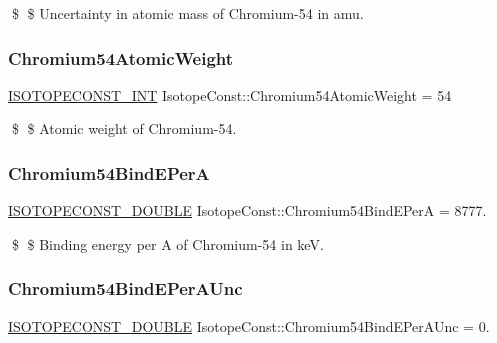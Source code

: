\$ \$ Uncertainty in atomic mass of Chromium-\/54 in amu. \mbox{\label{group___isotope_const-_chromium-_cr54_ga0bc122cbe23e1a05ae4f770c1b1b24de}} 
\subsubsection{\texorpdfstring{Chromium54\+Atomic\+Weight}{Chromium54AtomicWeight}}
{\footnotesize\ttfamily \mbox{\hyperlink{group___isotope_const-_macros_ga5f18360b3e99483a35c32d789e62621c}{I\+S\+O\+T\+O\+P\+E\+C\+O\+N\+S\+T\+\_\+\+I\+NT}} Isotope\+Const\+::\+Chromium54\+Atomic\+Weight = 54}

\$ \$ Atomic weight of Chromium-\/54. \mbox{\label{group___isotope_const-_chromium-_cr54_ga68a34d9a758e04f40316913c52387df7}} 
\subsubsection{\texorpdfstring{Chromium54\+Bind\+E\+PerA}{Chromium54BindEPerA}}
{\footnotesize\ttfamily \mbox{\hyperlink{group___isotope_const-_macros_ga8f45a7272ce02c0b4c65c44636ed719a}{I\+S\+O\+T\+O\+P\+E\+C\+O\+N\+S\+T\+\_\+\+D\+O\+U\+B\+LE}} Isotope\+Const\+::\+Chromium54\+Bind\+E\+PerA = 8777.}

\$ \$ Binding energy per A of Chromium-\/54 in keV. \mbox{\label{group___isotope_const-_chromium-_cr54_ga3a4b16fb8c7b84af8fccae0dd72aafb3}} 
\subsubsection{\texorpdfstring{Chromium54\+Bind\+E\+Per\+A\+Unc}{Chromium54BindEPerAUnc}}
{\footnotesize\ttfamily \mbox{\hyperlink{group___isotope_const-_macros_ga8f45a7272ce02c0b4c65c44636ed719a}{I\+S\+O\+T\+O\+P\+E\+C\+O\+N\+S\+T\+\_\+\+D\+O\+U\+B\+LE}} Isotope\+Const\+::\+Chromium54\+Bind\+E\+Per\+A\+Unc = 0.}

